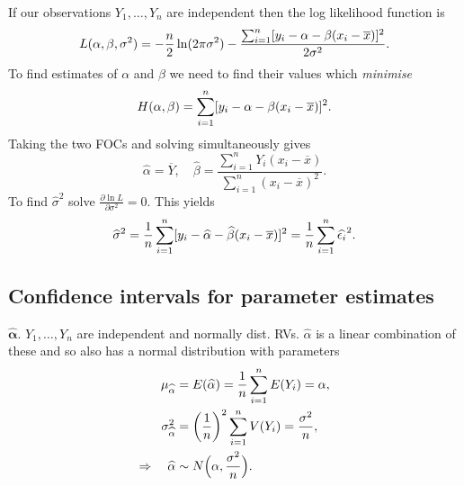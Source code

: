 \documentclass[10pt, two column]{article}
\begin{document}
If our observations $Y_{1}, \dots, Y_{n}$ are independent then the log likelihood function is \vspace{-6pt}
\[
L(\alpha, \beta, \sigma^{2}) = - \frac{n}{2} \ln (2\pi\sigma^{2}) - \frac{\sum_{i=1}^{n} [y_{i} - \alpha - \beta(x_{i} - \overline{x})]^{2}}{2\sigma^{2}}. \vspace{-6pt} 
\]
To find estimates of $\alpha$ and $\beta$ we need to find their values which \emph{minimise} \vspace{-6pt}
\[
H(\alpha, \beta) = \sum_{i=1}^{n} [y_{i} - \alpha - \beta(x_{i} - \overline{x})]^{2}. \vspace{-6pt}
\]
Taking the two FOCs and solving simultaneously gives 
\begin{equation}
\widehat{\alpha} = \overline{Y}, \quad \widehat{\beta} = \frac{\sum_{i=1}^{n} Y_{i}(x_{i} - \overline{x})}{\sum_{i=1}^{n} (x_{i} - \overline{x})^{2}}. \label{lm estimates}
\end{equation}
To find $\widehat{\sigma}^{2}$ solve $\frac{\partial \ln L}{\partial \sigma^{2}} = 0$. This yields \vspace{-6pt}
\[
\widehat{\sigma}^{2} = \frac{1}{n} \sum_{i=1}^{n} [y_{i} - \widehat{\alpha} - \widehat{\beta}(x_{i} - \overline{x})]^{2} = \frac{1}{n} \sum_{i=1}^{n} \widehat{\epsilon_{i}}^{2}. \vspace{-6pt}
\]

\subsection{Confidence intervals for parameter estimates}

$\boldsymbol{\widehat{\alpha}}$. $Y_{1}, \dots, Y_{n}$ are independent and normally dist. RVs. $\widehat{\alpha}$ is a linear combination of these and so also has a normal distribution with parameters \vspace{-6pt}
\begin{align*} 
\mu_{\widehat{\alpha}} &= E(\widehat{\alpha}) = \frac{1}{n} \sum_{i=1}^{n} E(Y_{i}) = \alpha, \\
\sigma_{\widehat{\alpha}}^{2} &= \left( \frac{1}{n} \right)^{2} \sum_{i=1}^{n} V(Y_{i}) = \frac{\sigma^{2}}{n}, \\
\Rightarrow \quad \widehat{\alpha} &\sim N\Big( \alpha, \frac{\sigma^{2}}{n} \Big). \vspace{-6pt}
\end{align*}
\end{document}
